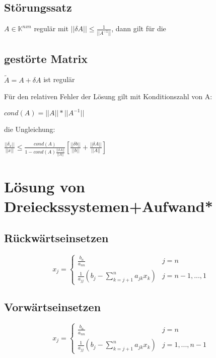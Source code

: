 \documentclass[12pt,a4paper]{article} %
\newcommand*\tab[1][1cm]{\hspace*{#1}}
\begin{document}
	\subsection{Störungssatz}
	
	$A \in \mathbb{K}^{n x n}$ regulär mit $||\delta A|| \le \frac{1}{||A^{-1}||}$, dann gilt für die
	
	\subsection{gestörte Matrix}
	
	$\tilde{A} = A + \delta A$ ist regulär
	
	Für den relativen Fehler der Lösung gilt mit Konditionszahl von A:
	
	\tab $cond(A) = ||A|| * ||A^{-1}||$
	
	die Ungleichung:
	
	\tab $\frac{||\delta_x||}{||x||} \le \frac{cond(A)}{1 - cond(A) \frac{||\delta A||}{||A||}}\left[ \frac{||\delta b||}{||b||} + \frac{||\delta A||}{||A||}\right] $
	
	\newpage
	
	\section{Lösung von Dreieckssystemen+Aufwand*}
	
	\subsection{Rückwärtseinsetzen}
	
	\[
		x_j=\left\{
			\begin{array}{ll}
				\frac{b_n}{a_{nn}} & j = n\\
				\frac{1}{a_{jj}}(b_j - \sum\limits_{k= j + 1}^na_{jk}x_k) & j = n - 1, ..., 1
			\end{array}
		\right.
	\]
	
	\subsection{Vorwärtseinsetzen}
	
	\[
		x_j=\left\{
			\begin{array}{ll}
				\frac{b_n}{a_{nn}} & j = n\\
				\frac{1}{a_{jj}}(b_j - \sum\limits_{k= j + 1}^na_{jk}x_k) & j = 1, ..., n - 1
			\end{array}
		\right.
	\]
	
\end{document}
